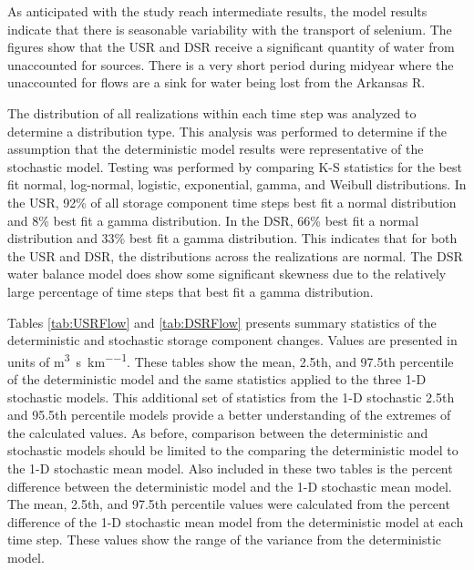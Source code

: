\begin{linenumbers}
As anticipated with the study reach intermediate results, the model results indicate that there is seasonable variability with the transport of selenium.  The figures show that the USR and DSR receive a significant quantity of water from unaccounted for sources.  There is a very short period during midyear where the unaccounted for flows are a sink for water being lost from the Arkansas R.

The distribution of all realizations within each time step was analyzed to determine a distribution type.  This analysis was performed to determine if the assumption that the deterministic model results were representative of the stochastic model.   Testing was performed by comparing K-S statistics for the best fit normal, log-normal, logistic, exponential, gamma, and Weibull distributions.  In the USR, 92\% of all storage component time steps best fit a normal distribution and 8\% best fit a gamma distribution.  In the DSR, 66\% best fit a normal distribution and 33\% best fit a gamma distribution.  This indicates that for both the USR and DSR, the distributions across the realizations are normal.  The DSR water balance model does show some significant skewness due to the relatively large percentage of time steps that best fit a gamma distribution.

Tables \ref{tab:USRFlow} and \ref{tab:DSRFlow} presents summary statistics of the deterministic and stochastic storage component changes.  Values are presented in units of \si{\cubic\meter\per\second\per\kilo\meter}.   These tables show the mean, 2.5th, and 97.5th percentile of the deterministic model and the same statistics applied to the three 1-D stochastic models.  This additional set of statistics from the 1-D stochastic 2.5th and 95.5th percentile models provide a better understanding of the extremes of the calculated values.  As before, comparison between the deterministic and stochastic models should be limited to the comparing the deterministic model to the 1-D stochastic mean model.  Also included in these two tables is the percent difference between the deterministic model and the 1-D stochastic mean model.  The mean, 2.5th, and 97.5th percentile values were calculated from the percent difference of the 1-D stochastic mean model from the deterministic model at each time step.  These values show the range of the variance from the deterministic model.


\end{linenumbers}
